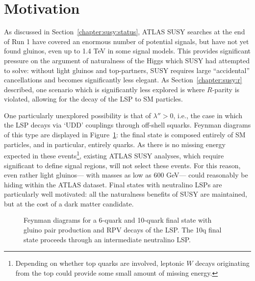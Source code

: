 \label{chapter:search}
\section{Motivation}

As discussed in Section~\ref{chapter:susy:status}, ATLAS SUSY searches at the end of Run 1 have covered an enormous number of potential signals, but have not yet found gluinos, even up to 1.4 TeV in some signal models. This provides significant pressure on the argument of naturalness of the Higgs which SUSY had attempted to solve: without light gluinos and top-partners, SUSY requires large ``accidental'' cancellations and becomes significantly less elegant. As Section~\ref{chapter:susy:r} described, one scenario which is significantly less explored is where $R$-parity is violated, allowing for the decay of the LSP to SM particles. 

One particularly unexplored possibility is that of $\lambda'' > 0$, i.e., the case in which the LSP decays via `UDD' couplings through off-shell squarks. Feynman diagrams of this type are displayed in Figure~\ref{fig:search:motivation:diagrams}: the final state is composed entirely of SM particles, and in particular, entirely quarks. As there is no missing energy expected in these events\footnote{Depending on whether top quarks are involved, leptonic $W$ decays originating from the top could provide some small amount of missing energy.}, existing ATLAS SUSY analyses, which require significant \met to define signal regions, will not select these events. For this reason, even rather light gluinos--- with masses as low as 600 GeV--- could reasonably be hiding within the ATLAS dataset. Final states with neutralino LSPs are particularly well motivated: all the naturalness benefits of SUSY are maintained, but at the cost of a dark matter candidate. 


\begin{figure}
\centering
{}
\caption{Feynman diagrams for a 6-quark and 10-quark final state with gluino pair production and RPV decays of the LSP. The 10q final state proceeds through an intermediate neutralino LSP.}
\label{fig:search:motivation:diagrams}
\end{figure}


